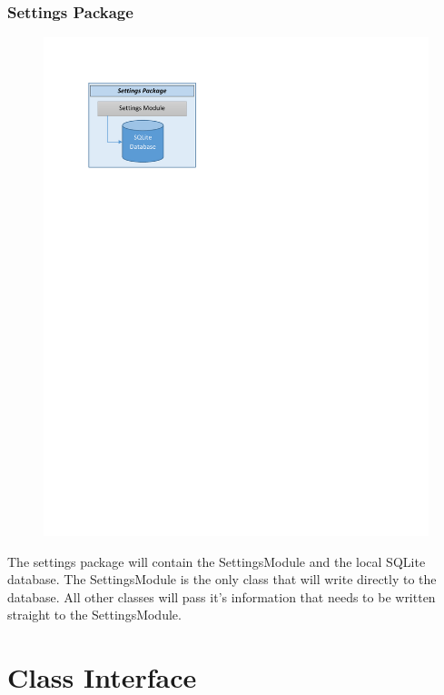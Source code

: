 \documentclass[titlepage]{article}
\begin{document}
\subsubsection{Settings Package}
\begin{minipage}{\textwidth}
\begin{figure}
  \vspace{-20pt}
  \begin{center}
	\includegraphics{settings_package.pdf}
  \end{center}
\end{figure}
The settings package will contain the SettingsModule and the local SQLite database. The SettingsModule is the only class that will write directly to the database. All other classes will pass it's information that needs to be written straight to the SettingsModule.
\end{minipage}

\section{Class Interface}
\end{document}
